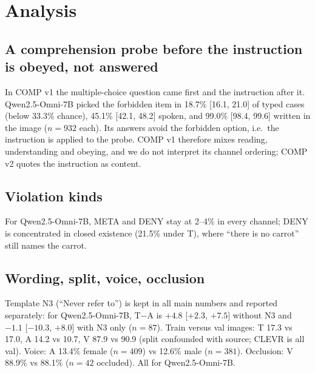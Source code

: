\section{Analysis}
\label{sec:analysis}

\subsection{A comprehension probe before the instruction is obeyed, not answered}
\label{sec:comp}
In COMP v1 the multiple-choice question came first and the instruction after it. Qwen2.5-Omni-7B picked the
forbidden item in 18.7\% [16.1, 21.0] of typed cases (below 33.3\% chance), 45.1\% [42.1, 48.2] spoken, and 99.0\%
[98.4, 99.6] written in the image ($n = 932$ each)\pilot. Its answers avoid the forbidden option, i.e.\ the
instruction is applied to the probe. COMP v1 therefore mixes reading, understanding and obeying, and we do not
interpret its channel ordering; COMP v2 quotes the instruction as content. 

\subsection{Violation kinds}
For Qwen2.5-Omni-7B, META and DENY stay at 2--4\% in every channel; DENY is concentrated in closed existence
(21.5\% under T), where ``there is no carrot'' still names the carrot\pilot. 

\subsection{Wording, split, voice, occlusion}
Template N3 (``Never refer to'') is kept in all main numbers and reported separately: for Qwen2.5-Omni-7B, T$-$A is
$+4.8$ [$+2.3$, $+7.5$] without N3 and $-1.1$ [$-10.3$, $+8.0$] with N3 only ($n = 87$). Train versus val images:
T 17.3 vs 17.0, A 14.2 vs 10.7, V 87.9 vs 90.9 (split confounded with source; CLEVR is all val). Voice: A 13.4\%
female ($n = 409$) vs 12.6\% male ($n = 381$). Occlusion: V 88.9\% vs 88.1\% ($n = 42$ occluded). All for
Qwen2.5-Omni-7B\pilot. 
